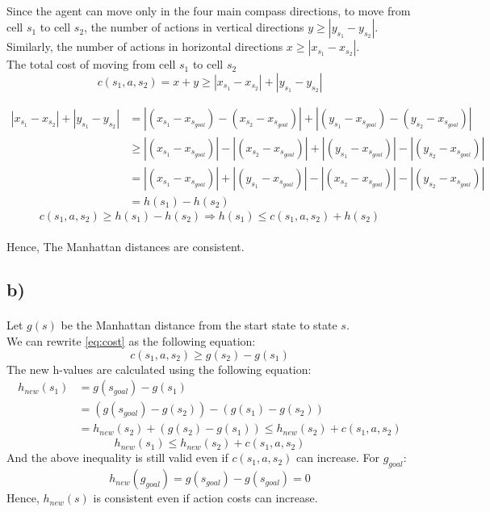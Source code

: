 \documentclass{article}
\begin{document}
\paragraph*{}
Since the agent can move only in the four main compass directions, to move from cell $s_1$ to cell $s_2$, the number of actions in vertical directions $y \ge |y_{s_1} - y_{s_2}|$. Similarly, the number of actions in horizontal directions $x \ge |x_{s_1} - x_{s_2}|$. \\
The total cost of moving from cell $s_1$ to cell $s_2$
\begin{equation}\label{eq:cost}
c(s_1, a, s_2) = x + y \ge |x_{s_1} - x_{s_2}| + |y_{s_1} - y_{s_2}|
\end{equation}

\begin{equation*}
\begin{split}
|x_{s_1} - x_{s_2}| + |y_{s_1} - y_{s_2}| &= |(x_{s_1} - x_{s_{goal}}) - (x_{s_2} - x_{s_{goal}})| + |(y_{s_1} - x_{s_{goal}}) - (y_{s_2} - x_{s_{goal}})|\\
&\ge |(x_{s_1} - x_{s_{goal}})| - |(x_{s_2} - x_{s_{goal}})| + |(y_{s_1} - x_{s_{goal}})| - |(y_{s_2} - x_{s_{goal}})|\\
&= |(x_{s_1} - x_{s_{goal}})| + |(y_{s_1} - x_{s_{goal}})| - |(x_{s_2} - x_{s_{goal}})| - |(y_{s_2} - x_{s_{goal}})|\\
&= h(s_1) - h(s_2)
\end{split}
\end{equation*}
$$c(s_1, a, s_2) \ge h(s_1) - h(s_2)\Longrightarrow h(s_1) \le c(s_1, a, s_2) + h(s_2)$$

\paragraph*{}
Hence, The Manhattan distances are consistent.

\subsection*{b)}

\paragraph*{}
Let $g(s)$ be the Manhattan distance from the start state to state $s$.\\
We can rewrite \eqref{eq:cost} as the following equation:
$$c(s_1, a, s_2) \ge g(s_2) - g(s_1)$$
The new h-values are calculated using the following equation:
\begin{equation*}
	\begin{split}
		h_{new}(s_1) &= g(s_{goal}) - g(s_1) \\
		&= (g(s_{goal}) - g(s_2)) - (g(s_1) - g(s_2)) \\
		&= h_{new}(s_2) + (g(s_2) - g(s_1)) \le h_{new}(s_2) + c(s_1, a, s_2)
	\end{split}
\end{equation*}
$$h_{new}(s_1) \le h_{new}(s_2) + c(s_1, a, s_2)$$
And the above inequality is still valid even if $c(s_1, a, s_2)$ can increase. For $g_{goal}$:
$$h_{new}(g_{goal}) = g(s_{goal}) - g(s_{goal}) = 0$$
Hence, $h_{new}(s)$ is consistent even if action costs can increase.
\end{document}
